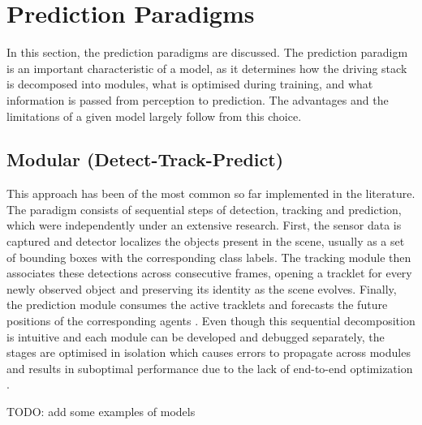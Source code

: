 \section{Prediction Paradigms}
\label{sec:sota-paradigms}
In this section, the prediction paradigms are discussed. The prediction paradigm is an important characteristic of a model, as it determines how the
driving stack is decomposed into modules, what is optimised during training, and what
information is passed from perception to prediction. The advantages and the limitations of a given model
largely follow from this choice.


\subsection{Modular (Detect-Track-Predict)}
\label{subsec:sota-modular}
This approach has been of the most common so far implemented in the literature. The paradigm consists 
of sequential steps of detection, tracking and prediction, which were independently under an extensive research. First, the sensor data is captured and
detector localizes the objects present in the scene, usually as a set of bounding boxes with the
corresponding class labels. The tracking module then associates these detections across consecutive frames,
opening a tracklet for every newly observed object and preserving its identity as the scene evolves.
Finally, the prediction module consumes the active tracklets and forecasts the future positions of the corresponding agents \cite{madjid2025survey}.
Even though this sequential decomposition is intuitive and each module can be developed and debugged
separately, the stages are optimised in isolation which causes errors to propagate 
across modules and results in suboptimal performance due to the lack of end-to-end optimization \cite{hu2025survey}.

TODO: add some examples of models

